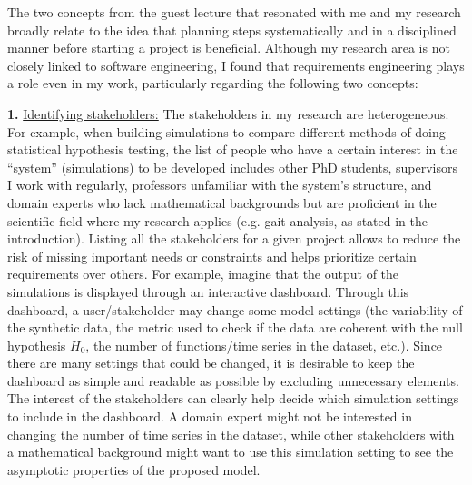 The two concepts from the guest lecture that resonated with me and my research broadly relate to the idea that planning steps systematically and in a disciplined manner before starting a project is beneficial. Although my research area is not closely linked to software engineering, I found that requirements engineering plays a role even in my work, particularly regarding the following two concepts:\par\vspace{1em}
\noindent
\textbf{1.} \underline{Identifying stakeholders:} The stakeholders in my research are heterogeneous. For example, when building simulations to compare different methods of doing statistical hypothesis testing, the list of people who have a certain interest in the “system” (simulations) to be developed includes other PhD students, supervisors I work with regularly, professors unfamiliar with the system's structure, and domain experts who lack mathematical backgrounds but are proficient in the scientific field where my research applies (e.g. gait analysis, as stated in the introduction). Listing all the stakeholders for a given project allows to reduce the risk of missing important needs or constraints and helps prioritize certain requirements over others. For example, imagine that the output of the simulations is displayed through an interactive dashboard. Through this dashboard, a user/stakeholder may change some model settings (the variability of the synthetic data, the metric used to check if the data are coherent with the null hypothesis $H_0$, the number of functions/time series in the dataset, etc.). Since there are many settings that could be changed, it is desirable to keep the dashboard as simple and readable as possible by excluding unnecessary elements. The interest of the stakeholders can clearly help decide which simulation settings to include in the dashboard. A domain expert might not be interested in changing the number of time series in the dataset, while other stakeholders with a mathematical background might want to use this simulation setting to see the asymptotic properties of the proposed model.\par\vspace{0.7em}
\noindent

